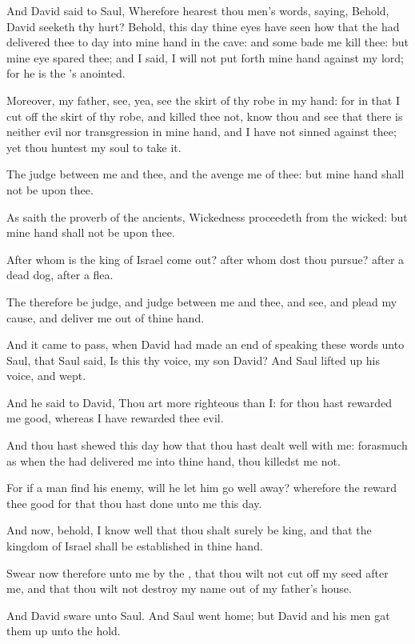 \verse And David said to Saul, Wherefore hearest thou men's words, saying, Behold, David seeketh thy hurt?  \verse Behold, this day thine eyes have seen how that the \LORD had delivered thee to day into mine hand in the cave: and some bade me kill thee: but mine eye spared thee; and I said, I will not put forth mine hand against my lord; for he is the \LORD's anointed.

\verse Moreover, my father, see, yea, see the skirt of thy robe in my hand: for in that I cut off the skirt of thy robe, and killed thee not, know thou and see that there is neither evil nor transgression in mine hand, and I have not sinned against thee; yet thou huntest my soul to take it.

\verse The \LORD judge between me and thee, and the \LORD avenge me of thee: but mine hand shall not be upon thee.

\verse As saith the proverb of the ancients, Wickedness proceedeth from the wicked: but mine hand shall not be upon thee.

\verse After whom is the king of Israel come out? after whom dost thou pursue? after a dead dog, after a flea.

\verse The \LORD therefore be judge, and judge between me and thee, and see, and plead my cause, and deliver me out of thine hand.

\verse And it came to pass, when David had made an end of speaking these words unto Saul, that Saul said, Is this thy voice, my son David? And Saul lifted up his voice, and wept.

\verse And he said to David, Thou art more righteous than I: for thou hast rewarded me good, whereas I have rewarded thee evil.

\verse And thou hast shewed this day how that thou hast dealt well with me: forasmuch as when the \LORD had delivered me into thine hand, thou killedst me not.

\verse For if a man find his enemy, will he let him go well away?  wherefore the \LORD reward thee good for that thou hast done unto me this day.

\verse And now, behold, I know well that thou shalt surely be king, and that the kingdom of Israel shall be established in thine hand.

\verse Swear now therefore unto me by the \LORD, that thou wilt not cut off my seed after me, and that thou wilt not destroy my name out of my father's house.

\verse And David sware unto Saul. And Saul went home; but David and his men gat them up unto the hold.



